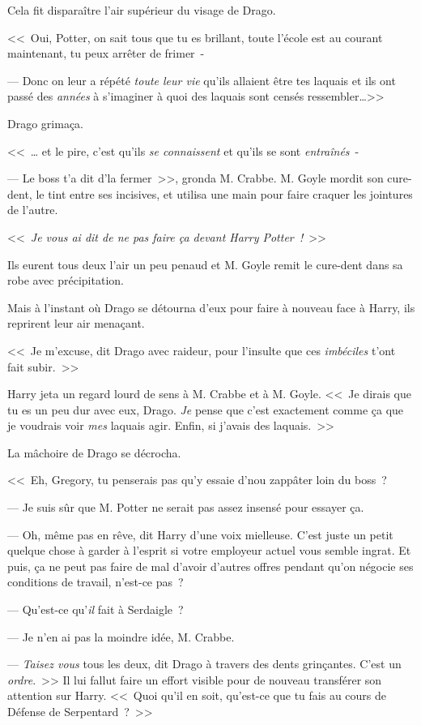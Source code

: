 Cela fit disparaître l'air supérieur du visage de Drago.

<<~Oui, Potter, on sait tous que tu es brillant, toute l'école est au courant maintenant, tu peux arrêter de frimer~-

--- Donc on leur a répété \emph{toute leur vie} qu'ils allaient être tes laquais et ils ont passé des \emph{années} à s'imaginer à quoi des laquais sont censés ressembler…>>

Drago grimaça.

<<~… et le pire, c'est qu'ils \emph{se connaissent} et qu'ils se sont \emph{entraînés}~-

--- Le boss t'a dit d'la fermer~>>, gronda M. Crabbe. M. Goyle mordit son cure-dent, le tint entre ses incisives, et utilisa une main pour faire craquer les jointures de l'autre.

<<~\emph{Je vous ai dit de ne pas faire ça devant Harry Potter~!}~>>

Ils eurent tous deux l'air un peu penaud et M. Goyle remit le cure-dent dans sa robe avec précipitation.

Mais à l'instant où Drago se détourna d'eux pour faire à nouveau face à Harry, ils reprirent leur air menaçant.

<<~Je m'excuse, dit Drago avec raideur, pour l'insulte que ces \emph{imbéciles} t'ont fait subir.~>>

Harry jeta un regard lourd de sens à M. Crabbe et à M. Goyle. <<~Je dirais que tu es un peu dur avec eux, Drago. \emph{Je} pense que c'est exactement comme ça que je voudrais voir \emph{mes} laquais agir. Enfin, si j'avais des laquais.~>>

La mâchoire de Drago se décrocha.

<<~Eh, Gregory, tu penserais pas qu'y essaie d'nou zappâter loin du boss~?

--- Je suis sûr que M. Potter ne serait pas assez insensé pour essayer ça.

--- Oh, même pas en rêve, dit Harry d'une voix mielleuse. C'est juste un petit quelque chose à garder à l'esprit si votre employeur actuel vous semble ingrat. Et puis, ça ne peut pas faire de mal d'avoir d'autres offres pendant qu'on négocie ses conditions de travail, n'est-ce pas~?

--- Qu'est-ce qu'\emph{il} fait à Serdaigle~?

--- Je n'en ai pas la moindre idée, M. Crabbe.

--- \emph{Taisez vous} tous les deux, dit Drago à travers des dents grinçantes. C'est un \emph{ordre}.~>> Il lui fallut faire un effort visible pour de nouveau transférer son attention sur Harry. <<~Quoi qu'il en soit, qu'est-ce que tu fais au cours de Défense de Serpentard~?~>>

